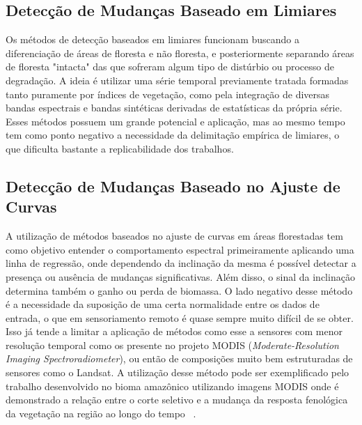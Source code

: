 \documentclass[twocolumn]{article}
\begin{document}
\subsection{Detecção de Mudanças Baseado em Limiares}
Os métodos de detecção baseados em limiares funcionam buscando a diferenciação de áreas de floresta e não floresta, e posteriormente separando áreas de floresta "intacta" das que sofreram algum tipo de distúrbio ou processo de degradação. A ideia é utilizar uma série temporal previamente tratada formadas tanto puramente por índices de vegetação, como pela integração de diversas bandas espectrais e bandas sintéticas derivadas de estatísticas da própria série. Esses métodos possuem um grande potencial e aplicação, mas ao mesmo tempo tem como ponto negativo a necessidade da delimitação empírica de limiares, o que dificulta bastante a replicabilidade dos trabalhos.

\subsection{Detecção de Mudanças Baseado no Ajuste de Curvas}
A utilização de métodos baseados no ajuste de curvas em áreas florestadas tem como objetivo entender o comportamento espectral primeiramente aplicando uma linha de regressão, onde dependendo da inclinação da mesma é possível detectar a presença ou ausência de mudanças significativas. Além disso, o sinal da inclinação determina também o ganho ou perda de biomassa. O lado negativo desse método é a necessidade da suposição de uma certa normalidade entre os dados de entrada, o que em sensoriamento remoto é quase sempre muito difícil de se obter. Isso já tende a limitar a aplicação de métodos como esse a sensores com menor resolução temporal como os presente no projeto MODIS (\textit{Moderate-Resolution Imaging Spectroradiometer}), ou então de composições muito bem estruturadas de sensores como o Landsat. A utilização desse método pode ser exemplificado pelo trabalho desenvolvido no bioma amazônico utilizando imagens MODIS onde é demonstrado a relação entre o corte seletivo e a mudança da resposta fenológica da vegetação na região ao longo do tempo ~\cite{KOLTUNOV20092431}.
\end{document}
